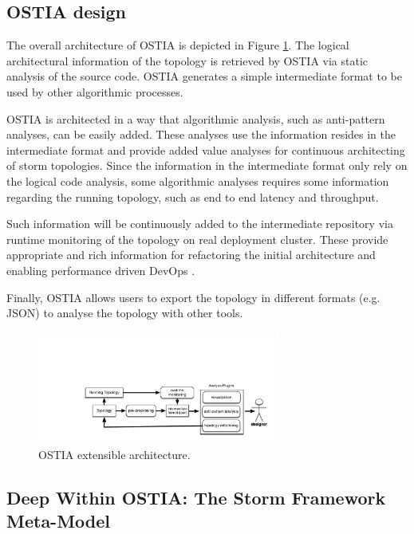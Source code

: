 \subsection{OSTIA design}

The overall architecture of OSTIA is depicted in
Figure \ref{fig:ostia-arch}. The logical architectural information of the
topology is retrieved by OSTIA via static analysis of the source code. OSTIA
generates a simple intermediate format to be used by other algorithmic
processes.

OSTIA is architected in a way that algorithmic analysis, such as anti-pattern
analyses, can be easily added. These analyses use the information resides in the
intermediate format and provide added value analyses for continuous architecting
of storm topologies. Since the information in the intermediate format only rely
on the logical code analysis, some algorithmic analyses requires some
information regarding the running topology, such as end to end latency and
throughput.

Such information will be continuously added to the intermediate repository via
runtime monitoring of the topology on real deployment cluster. These provide
appropriate and rich information for refactoring the initial architecture and
enabling performance driven DevOps \cite{brunnert2015performance}.

Finally, OSTIA allows users to export the topology in different formats
(e.g. JSON) to analyse the topology with other tools.

\begin{figure}[H]
	\begin{center}
		\includegraphics[width=8cm]{images/ostia-arch}
		\caption{OSTIA extensible architecture.}
		\label{fig:ostia-arch}
	\end{center}
\end{figure}

\subsection{Deep Within OSTIA: The Storm Framework Meta-Model}

